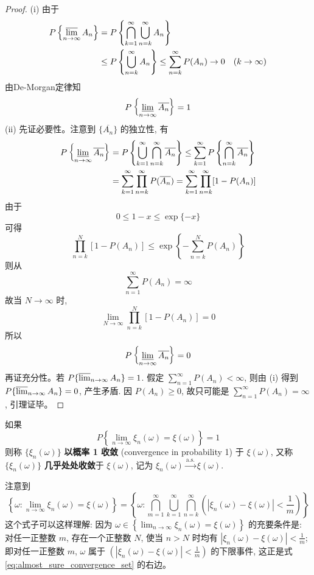 \begin{proof}
(i) 由于
\begin{align*}
P\left\{ \varlimsup_{n\to\infty} A_n \right\} &= P\left\{ \bigcap_{k=1}^\infty \bigcup_{n=k}^\infty A_n \right\} \\
&\le P\left\{ \bigcup_{n=k}^\infty A_n \right\} \le \sum_{n=k}^\infty P(A_n) \to 0 \quad (k \to \infty)
\end{align*}
由De-Morgan定律知
\[
P\left\{ \varliminf_{n\to\infty} \overline{A_n} \right\} = 1
\]
(ii) 先证必要性。注意到 $\{\overline{A_n}\}$ 的独立性, 有
\begin{align} \label{eq:borel_cantelli_ii_proof}
P\left\{ \varliminf_{n\to\infty} \overline{A_n} \right\} &= P\left\{ \bigcup_{k=1}^\infty \bigcap_{n=k}^\infty \overline{A_n} \right\} \le \sum_{k=1}^\infty P\left\{ \bigcap_{n=k}^\infty \overline{A_n} \right\} \notag \\
&= \sum_{k=1}^\infty \prod_{n=k}^\infty P(\overline{A_n}) = \sum_{k=1}^\infty \prod_{n=k}^\infty [1 - P(A_n)]
\end{align}
由于
\[
0 \le 1-x \le \exp\{-x\}
\]
可得
\[
\prod_{n=k}^N [1 - P(A_n)] \le \exp\left\{-\sum_{n=k}^N P(A_n)\right\}
\]
则从
\[
\sum_{n=1}^\infty P(A_n) = \infty
\]
故当 $N \to \infty$ 时,
\[
\lim_{N\to\infty} \prod_{n=k}^N [1 - P(A_n)] = 0
\]
所以
\[
P\left\{ \varliminf_{n\to\infty} \overline{A_n} \right\} = 0
\]
再证充分性。若 $P\{ \varlimsup_{n\to\infty} A_n \} = 1$. 假定 $\sum_{n=1}^\infty P(A_n) < \infty$, 则由 (i)
得到 $P\{ \varlimsup_{n\to\infty} A_n \} = 0$, 产生矛盾. 因 $P(A_n) \ge 0$, 故只可能是
$\sum_{n=1}^\infty P(A_n) = \infty$, 引理证毕。
\end{proof}

\begin{definition}[以概率 1 收敛]\label{def:convergence_almost_surely}
如果
\begin{equation} \label{eq:5.2.24}
P\left\{ \lim_{n\to\infty} \xi_n(\omega) = \xi(\omega) \right\} = 1
\end{equation}
则称 $\{\xi_n(\omega)\}$ \textbf{以概率 1 收敛} (convergence in probability 1) 于 $\xi(\omega)$, 又称 $\{\xi_n(\omega)\}$ \textbf{几乎处处收敛}于 $\xi(\omega)$, 记为 $\xi_n(\omega) \xrightarrow{\text{a.s.}} \xi(\omega)$.
\end{definition}
\begin{remark}
注意到
\begin{equation} \label{eq:almost_sure_convergence_set}
\left\{ \omega: \lim_{n\to\infty} \xi_n(\omega) = \xi(\omega) \right\}= \left\{ \omega: \bigcap_{m=1}^\infty \bigcup_{k=1}^\infty \bigcap_{n=k}^\infty \left( \left|\xi_n(\omega)-\xi(\omega)\right| < \frac{1}{m} \right) \right\}
\end{equation}
这个式子可以这样理解: 因为 $\omega \in \left\{ \lim_{n\to\infty} \xi_n(\omega) = \xi(\omega) \right\}$ 的充要条件是: 对任一正整数 $m$, 存在一个正整数 $N$, 使当 $n>N$ 时均有 $|\xi_n(\omega)-\xi(\omega)| < \frac{1}{m}$; 即对任一正整数 $m$, $\omega$ 属于 $\left( \left|\xi_n(\omega)-\xi(\omega)\right| < \frac{1}{m} \right)$ 的下限事件, 这正是式 \eqref{eq:almost_sure_convergence_set} 的右边。
\end{remark}

